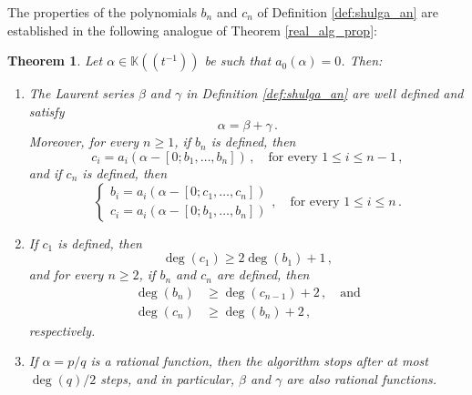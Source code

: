 \documentclass[a4paper,12pt]{article}
\newtheorem{thm}{Theorem}
\def\fq{\bbk}
\def\fttt{\fq\!\left(\!\left(t^{-1}\right)\!\right)}
\def\bbk{\mathbb{K}}
\begin{document}
The properties of the polynomials $b_n$ and $c_n$ of Definition \ref{def:shulga_an} are established in the following analogue of Theorem \ref{real_alg_prop}:
\begin{thm}
\label{laurent_prop}
Let $\alpha\in\fttt$ be such that $a_0(\alpha)=0$. Then:
\begin{enumerate}
\item\label{item:1}{
The Laurent series $\beta$ and $\gamma$ in Definition \ref{def:shulga_an} are well defined and satisfy 
\begin{equation*}
    \alpha=\beta+\gamma\,.    
\end{equation*} 
Moreover, for every $n\geq1$, if $b_n$ is defined, then
\begin{equation}%
\label{ck_well_defined}
    c_i = a_i(\alpha-[0;b_1,\ldots,b_n])\,,\quad\textrm{for every $1\leq i\leq n-1$}\,,
\end{equation}
and if $c_n$ is defined, then
\begin{equation}%
\label{bk_well_defined}
    \begin{cases*}
        b_i = a_i(\alpha-[0;c_1,\ldots, c_n])\\
        c_i = a_i(\alpha-[0;b_1,\ldots,b_n])
    \end{cases*},
    \quad\textrm{for every $1\leq i\leq n$}\,.
\end{equation}
}
\item\label{item:2}
{If $c_1$ is defined, then 
\begin{equation}\label{eq:first_digits}
    \deg(c_1)\geq 2\deg(b_1)+1\,,
\end{equation} 
and for every $n\ge 2$, if $b_n$ and $c_n$ are defined, then
\begin{align*}
\deg(b_n) &\geq \deg(c_{n-1})+2\,,\quad\textrm{and}\\
\deg(c_n) &\geq \deg(b_n)+2\,,
\end{align*}
respectively.
}
\item
{If $\alpha=p/q$ is a rational function, then the algorithm stops after at most $\deg(q)/2$ steps, and in particular, $\beta$ and $\gamma$ are also rational functions.
}
\end{enumerate}
\end{thm}

\end{document}
